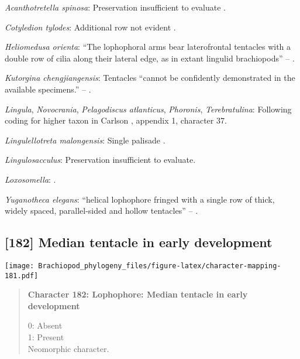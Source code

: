 \documentclass[openany]{book}
\theoremstyle{definition}
\theoremstyle{definition}
\theoremstyle{definition}
\theoremstyle{remark}
\begin{document}
\hypertarget{Acanthotretella_spinosa-coding-181}{}
\emph{Acanthotretella spinosa}: Preservation insufficient to evaluate
\citep{Holmer2006Aspinose}.

\hypertarget{Cotyledion_tylodes-coding-181}{}
\emph{Cotyledion tylodes}: Additional row not evident \citep{Zhang2013}.

\hypertarget{Heliomedusa_orienta-coding-181}{}
\emph{Heliomedusa orienta}: ``The lophophoral arms bear laterofrontal
tentacles with a double row of cilia along their lateral edge, as in
extant lingulid brachiopods'' -- \citet{Zhang2009Architectureand}.

\hypertarget{Kutorgina_chengjiangensis-coding-181}{}
\emph{Kutorgina chengjiangensis}: Tentacles ``cannot be confidently
demonstrated in the available specimens.'' --
\citet{Zhang2007Rhynchonelliformeanbrachiopods}.

\hypertarget{Lingula-coding-181}{}
\emph{Lingula}, \emph{Novocrania}, \emph{Pelagodiscus atlanticus},
\emph{Phoronis}, \emph{Terebratulina}: Following coding for higher taxon
in Carlson \citeyearpar{Carlson1995Phylogeneticrelationships}, appendix
1, character 37.

\hypertarget{Lingulellotreta_malongensis-coding-181}{}
\emph{Lingulellotreta malongensis}: Single palisade
\citep{Zhang2004Newdata}.

\hypertarget{Lingulosacculus-coding-181}{}
\emph{Lingulosacculus}: Preservation insufficient to evaluate.

\hypertarget{Loxosomella-coding-181}{}
\emph{Loxosomella}: \citet{Nielsen1966}.

\hypertarget{Yuganotheca_elegans-coding-181}{}
\emph{Yuganotheca elegans}: ``helical lophophore fringed with a single
row of thick, widely spaced, parallel-sided and hollow tentacles'' --
\citet{Zhang2014Anearly}.

\subsection*{{[}182{]} Median tentacle in early
development}\label{median-tentacle-in-early-development}

\texttt{[image: Brachiopod\_phylogeny\_files/figure-latex/character-mapping-181.pdf]}

\begin{quote}
\textbf{Character 182: Lophophore: Median tentacle in early development}

0: Absent\\
1: Present\\
Neomorphic character.
\end{quote}
\end{document}
